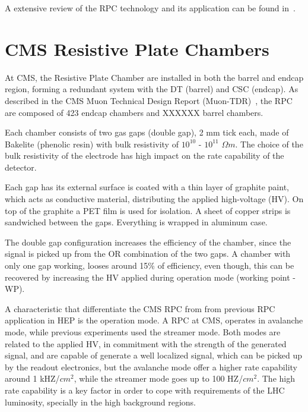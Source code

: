 A extensive review of the RPC technology and its application can be found in~\cite{livro_rpc}.



\section{CMS Resistive Plate Chambers}

At CMS, the Resistive Plate Chamber are installed in both the barrel and endcap region, forming a redundant system with the DT (barrel) and CSC (endcap). As described in the CMS Muon Technical Design Report (Muon-TDR)~\cite{muon_tdr}, the RPC are composed of 423 endcap chambers and XXXXXX  barrel chambers.

Each chamber consists of two gas gaps (double gap), 2 mm tick each, made of Bakelite (phenolic resin) with bulk resistivity of $10^{10}$ - $10^{11}$ $\Omega m$. The choice of the bulk resistivity of the electrode has high impact on the rate capability of the detector.

Each gap has its external surface is coated with a thin layer of graphite paint, which acts as conductive material, distributing the applied high-voltage (HV). On top of the graphite a PET film is used for isolation. A sheet of copper strips is sandwiched between the gaps. Everything is wrapped in aluminum case.

The double gap configuration increases the efficiency of the chamber, since the signal is picked up from the OR combination of the two gaps. A chamber with only one gap working, looses around 15\% of efficiency, even though, this can be recovered by increasing the HV applied during operation mode (working point - WP).

A characteristic that differentiate the CMS RPC  from from previous RPC application in HEP is the operation mode. A RPC at CMS, operates in avalanche mode, while previous experiments used the streamer mode. Both modes are related to the applied HV, in commitment with the strength of the generated signal, and are capable of generate a well localized signal, which can be picked up by the readout electronics, but the avalanche mode offer a higher rate capability around 1 kHZ/$cm^2$, while the streamer mode goes up to 100 HZ/$cm^2$. The high rate capability is a key factor in order to cope with requirements of the LHC luminosity, specially in the high background regions.

